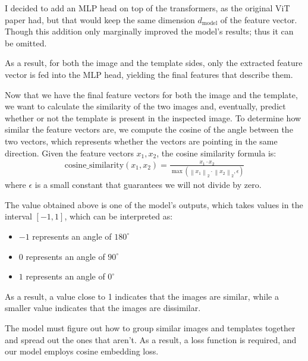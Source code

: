\documentclass{report}[12pt, a4paper]
\begin{document}
I decided to add an MLP head on top of the transformers, as the original ViT paper had, but that would keep the same dimension $d_{\text{model}}$ of the feature vector. Though this addition only marginally improved the model's results; thus it can be omitted.

As a result, for both the image and the template sides, only the extracted feature vector is fed into the MLP head, yielding the final features that describe them.

Now that we have the final feature vectors for both the image and the template, we want to calculate the similarity of the two images and, eventually, predict whether or not the template is present in the inspected image. To determine how similar the feature vectors are, we compute the cosine of the angle between the two vectors, which represents whether the vectors are pointing in the same direction. Given the feature vectors $x_{1}, x_{2}$, the cosine similarity formula is:
\begin{align*}
    \text{cosine\_similarity}\left(x_{1}, x_{2}\right) = \frac{x_{1}\cdot x_{2}}{\max\left(\left\lVert x_{1}\right\rVert_2\cdot \left\lVert x_{2}\right\rVert_2, \epsilon\right)}
\end{align*}
where $\epsilon$ is a small constant that guarantees we will not divide by zero.

The value obtained above is one of the model's outputs, which takes values in the interval $\left[-1,1\right]$, which can be interpreted as:
\begin{itemize}
    \item $-1$ represents an angle of $180^{\circ}$
    \item $0$ represents an angle of $90^{\circ}$
    \item $1$ represents an angle of $0^{\circ}$
\end{itemize}
As a result, a value close to 1 indicates that the images are similar, while a smaller value indicates that the images are dissimilar.

The model must figure out how to group similar images and templates together and spread out the ones that aren't. As a result, a loss function is required, and our model employs cosine embedding loss.
\end{document}
